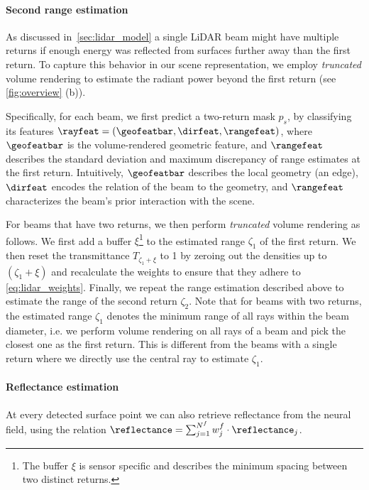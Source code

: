 \paragraph{Second range estimation}
As discussed in~\cref{sec:lidar_model} a single LiDAR beam might have multiple returns if enough energy was reflected from surfaces further away than the first return. To capture this behavior in our scene representation, we employ \textit{truncated} volume rendering to estimate the radiant power beyond the first return (see \cref{fig:overview} (b)).

Specifically, for each beam, we first predict a two-return mask $p_s$, by classifying its features $\rayfeat = (\geofeatbar,\dirfeat,\rangefeat)$, where $\geofeatbar$ is the volume-rendered geometric feature, and $\rangefeat$ describes the standard deviation and maximum discrepancy of range estimates at the first return. Intuitively, $\geofeatbar$ describes the local geometry (\eg an edge), $\dirfeat$ encodes the relation of the beam to the geometry, and $\rangefeat$ characterizes the beam's prior interaction with the scene.

For beams that have two returns, we then perform \textit{truncated} volume rendering as follows. We first add a buffer $\xi$\footnote{The buffer $\xi$ is sensor specific and describes the minimum spacing between two distinct returns.} to the estimated range $\zeta_1$ of the first return. We then reset the transmittance $T_{\zeta_1 + \xi}$ to 1 by zeroing out the densities up to $(\zeta_1 + \xi)$ and recalculate the weights to ensure that they adhere to \cref{eq:lidar_weights}. Finally, we repeat the range estimation described above to estimate the range of the second return $\zeta_2$. Note that for beams with two returns, the estimated range $\zeta_1$ denotes the minimum range of all rays within the beam diameter, i.e. we perform volume rendering on all rays of a beam and pick the closest one as the first return. This is different from the beams with a single return where we directly use the central ray to estimate $\zeta_1$. 






\paragraph{Reflectance estimation}
At every detected surface point we can also retrieve reflectance from the neural field, using the relation $\reflectance = \sum_{j=1}^{N^f} w_j^f \cdot \reflectance_j$.



